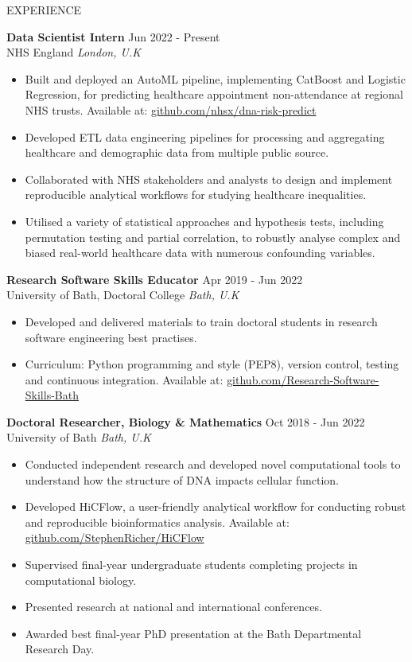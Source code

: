 \documentclass{cv} %
\begin{document}
\begin{rSection}{EXPERIENCE}

\textbf{Data Scientist Intern} \hfill Jun 2022 - Present \\
NHS England \hfill \textit{London, U.K}
 \begin{itemize}
    \itemsep -3pt {} 
    \item Built and deployed an AutoML pipeline, implementing CatBoost and Logistic Regression, for predicting healthcare appointment non-attendance at regional NHS trusts. Available at: \href{https://github.com/nhsx/dna-risk-predict}{github.com/nhsx/dna-risk-predict}
    \item Developed ETL data engineering pipelines for processing and aggregating healthcare and demographic data from multiple public source.
    \item Collaborated with NHS stakeholders and analysts to design and implement reproducible analytical workflows for studying healthcare inequalities.
    \item Utilised a variety of statistical approaches and hypothesis tests, including permutation testing and partial correlation, to robustly analyse complex and biased real-world healthcare data with numerous confounding variables.
 \end{itemize}

\textbf{Research Software Skills Educator} \hfill Apr 2019 - Jun 2022 \\
University of Bath, Doctoral College \hfill \textit{Bath, U.K}
 \begin{itemize}
    \itemsep -3pt {} 
    \item Developed and delivered materials to train doctoral students in research software engineering best practises.
    \item Curriculum: Python programming and style (PEP8), version control, testing and continuous integration. Available at: \href{https://github.com/Research-Software-Skills-Bath}{github.com/Research-Software-Skills-Bath}
 \end{itemize}

\textbf{Doctoral Researcher, Biology \& Mathematics} \hfill Oct 2018 - Jun 2022 \\
University of Bath \hfill \textit{Bath, U.K}
 \begin{itemize}
    \itemsep -3pt {} 
    \item Conducted independent research and developed novel computational tools to understand how the structure of DNA impacts cellular function.
    \item Developed HiCFlow, a user-friendly analytical workflow for conducting robust and reproducible bioinformatics analysis. Available at: \href{https://github.com/StephenRicher/HiCFlow}{github.com/StephenRicher/HiCFlow}
    \item Supervised final-year undergraduate students completing projects in computational biology.
    \item Presented research at national and international conferences.
    \item Awarded best final-year PhD presentation at the Bath Departmental Research Day.
 \end{itemize}


\end{rSection}
\end{document}
